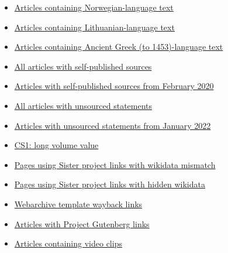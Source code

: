 \documentclass[11pt,a4paper]{article}
\begin{document}
\begin{itemize}
\item \href{/wiki/Category:Articles\_containing\_Norwegian-language\_text}{Articles containing Norwegian-language text}
\item \href{/wiki/Category:Articles\_containing\_Lithuanian-language\_text}{Articles containing Lithuanian-language text}
\item \href{/wiki/Category:Articles\_containing\_Ancient\_Greek\_\%28to\_1453\%29-language\_text}{Articles containing Ancient Greek (to 1453)-language text}
\item \href{/wiki/Category:All\_articles\_with\_self-published\_sources}{All articles with self-published sources}
\item \href{/wiki/Category:Articles\_with\_self-published\_sources\_from\_February\_2020}{Articles with self-published sources from February 2020}
\item \href{/wiki/Category:All\_articles\_with\_unsourced\_statements}{All articles with unsourced statements}
\item \href{/wiki/Category:Articles\_with\_unsourced\_statements\_from\_January\_2022}{Articles with unsourced statements from January 2022}
\item \href{/wiki/Category:CS1:\_long\_volume\_value}{CS1: long volume value}
\item \href{/wiki/Category:Pages\_using\_Sister\_project\_links\_with\_wikidata\_mismatch}{Pages using Sister project links with wikidata mismatch}
\item \href{/wiki/Category:Pages\_using\_Sister\_project\_links\_with\_hidden\_wikidata}{Pages using Sister project links with hidden wikidata}
\item \href{/wiki/Category:Webarchive\_template\_wayback\_links}{Webarchive template wayback links}
\item \href{/wiki/Category:Articles\_with\_Project\_Gutenberg\_links}{Articles with Project Gutenberg links}
\item \href{/wiki/Category:Articles\_containing\_video\_clips}{Articles containing video clips}
\end{itemize}
\end{document}
